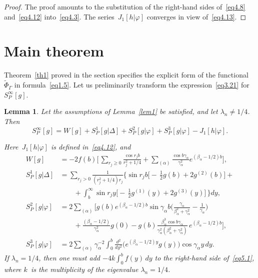 \documentclass{amsart}
\theoremstyle{plain}
\newtheorem{lemma}{Lemma}
\theoremstyle{definition}
\numberwithin{equation}{section}
\begin{document}
\begin{proof}
The proof amounts to the substitution of the right-hand sides
of~\eqref{eq4.8} and~\eqref{eq4.12} into~\eqref{eq4.3}. The
series~$J_1[h|\varphi]$ converges in view of~\eqref{eq4.13}.
\end{proof}




\section{Main theorem}
\label{sec5}

Theorem~\ref{th1} proved in the section specifies the explicit form
of the functional~$\widetilde\Phi_\Gamma$ in formula~\eqref{eq1.5}.
Let us preliminarily transform the expression~\eqref{eq3.21}
for~$S_P^\infty[g]$.

\begin{lemma}
 \label{lem4}
Let the assumptions of Lemma~\ref{lem1} be satisfied, and let
$\lambda_n \ne 1/4$. Then
\begin{equation}
\label{eq5.1}
S_P^\infty[g]=W[g]+S_P^1[g|\Delta]+S_P^2[g|\varphi]+S_P^3[g|\varphi]-
J_1[h|\varphi].
\end{equation}

Here~$J_1[h|\varphi]$ is defined in~\eqref{eq4.12}, and
\begin{align}
\label{eq5.2}
W[g]&=-2f(b)\biggl[\,\sum_{r_j \geqslant 0}\frac{\cos r_jb}{r_j^2+1/4}+
\sum_{(\alpha)}\frac{\cos b\gamma_\alpha}{\gamma_\alpha^2}
e^{(\beta_\alpha-1/2)b}\biggr],
\\
\nonumber
S_P^1[g|\Delta]&=\sum_{r_j > 0}\frac{1}{(r_j^2+1/4)r_j}\biggl\{\sin r_jb
\biggl[-\,\frac{1}{2}g(b)+2g^{(2)}(b)\biggr]+
\\
\label{eq5.3}
&\qquad+\int_b^\infty \sin r_jy\biggl[-\,\frac{1}{2}g^{(1)}(y)+
2g^{(3)}(y)\biggr]\,\biggr\}dy,
\\
\nonumber
S_P^2[g|\varphi]&=2\sum_{(\alpha)}\biggl[g(b)e^{(\beta_\alpha-1/2)b}
\sin\gamma_\alpha b\biggl(\frac{\gamma_\alpha}{\beta_\alpha^2+\gamma_\alpha^2}
-\frac{1}{\gamma_\alpha}\biggr)
\\
&\qquad+\frac{(\beta_\alpha-1/2)}{\gamma_\alpha^2}g(0)-g(b)
\frac{\beta_\alpha^3\cos b\gamma_\alpha}
{\gamma_\alpha^2(\beta_\alpha^2+\gamma_\alpha^2)}\,
e^{(\beta_\alpha-1/2)b}\biggr],
\label{eq5.4}
\\
\label{eq5.5}
S_P^3[g|\varphi]&=2\sum_{(\alpha)}\gamma_\alpha^{-2}\int_0^b
\frac{d^2}{dy^2}\bigl(e^{(\beta_\alpha-1/2)y}g(y)\bigr)
\cos\gamma_\alpha y\,dy.
\end{align}
If $\lambda_n=1/4$, then one must add $-4k\displaystyle\int_0^b
f(y)\,dy$ to the right-hand side of~\eqref{eq5.1}, where $k$~is the
multiplicity of the eigenvalue $\lambda_n=1/4$.
\end{lemma}
\end{document}
